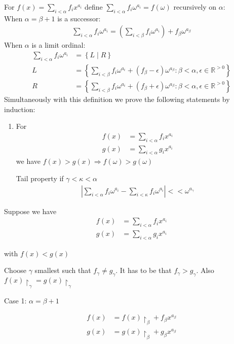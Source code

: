 \documentclass{article}
\newcommand{\paren}[1]{\left( #1 \right)}
\newcommand{\curly}[1]{\left\{ #1 \right\}}
\newcommand{\R}{\mathbb{R}}
\newcommand{\w}{\omega}
\newcommand{\midr}[1]{\restriction_{#1}}
\begin{document}
For $f(x) = \sum_{i < \alpha} f_i x^{a_i}$ define $\sum_{i < \alpha} f_i \w^{a_i} = f(\omega)$ recursively on $\alpha$: \\ 
When $\alpha = \beta + 1$ is a successor:
\begin{align*}
	\sum_{i < \alpha} f_i \w^{a_i} = \paren{\sum_{i < \beta} f_i \omega^{a_i}} + f_\beta \w^{a_\beta}
\end{align*}
When $\alpha$ is a limit ordinal:
\begin{align*}
	\sum_{i < \alpha} f_i \w^{a_i} &= \curly{L \mid R} \\
  L &= \curly{\sum_{i < \beta} f_i \w^{a_i} + (f_\beta - \epsilon) \w^{a_\beta}
	\colon \beta < \alpha, \epsilon \in \R^{>0}} \\
  R &= \curly{\sum_{i < \beta} f_i \w^{a_i} + (f_\beta + \epsilon) \w^{a_\beta}
	\colon \beta < \alpha, \epsilon \in \R^{>0}}
\end{align*}
Simultaneously with this definition we prove the following statements by induction:
\begin{enumerate}
	\item For
	\begin{align*}
		f(x) &= \sum_{i < \alpha} f_i x^{a_i} \\
		g(x) &= \sum_{i < \alpha} g_i x^{a_i}
	\end{align*}
	we have $f(x) > g(x) \Rightarrow f(\w) > g(\w)$
	\item [Tail property] if $\gamma < \kappa < \alpha$
	\begin{align*}
		\left| \sum_{i < \alpha} f_i \w^{a_i} - \sum_{i < \kappa} f_i \w^{a_i} \right| << \w^{a_\gamma}
	\end{align*}
\end{enumerate}

Suppose we have
\begin{align*}
  f(x) &= \sum_{i < \alpha} f_i x^{a_i} \\
  g(x) &= \sum_{i < \alpha} g_i x^{a_i}
\end{align*}

with $f(x) < g(x)$

Choose $\gamma$ smallest such that $f_\gamma \neq g_\gamma$.
It has to be that $f_\gamma > g_\gamma$. Also $f(x)\midr\gamma = g(x)\midr\gamma$

Case 1: $\alpha = \beta + 1$

\begin{align*}
  f(x) &= f(x)\midr\beta + f_\beta x^{a_\beta}\\
  g(x) &= g(x)\midr\beta + g_\beta x^{a_\beta}
\end{align*}
\end{document}
